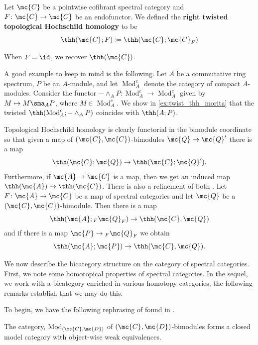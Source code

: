 \documentclass[11pt]{amsart}
\begin{document}
\begin{defn}\label{right_twisted}
  Let $\mc{C}$ be a pointwise cofibrant spectral category and $F\colon  \mc{C} \to \mc{C}$ be an endofunctor. We defined the \textbf{right twisted topological Hochschild homology} to be
  \[
  \thh(\mc{C}; F)\coloneqq\thh(\mc{C}; \mc{C}_F) 
  \]
\end{defn}

\begin{rmk}
When $F = \id$, we recover $\thh(\mc{C})$. 
\end{rmk}

\begin{example}\label{eg:twisted_thh}
A good example to keep in mind is the following. Let $A$ be a commutative ring spectrum,  $P$ be an $A$-module, and let $\operatorname{Mod}^c_A$ denote the category of compact $A$-modules. Consider the functor $-\wedge_AP \colon  \operatorname{Mod}^c_A \to \operatorname{Mod}^c_A$ given by $M \mapsto M \sma_A P$, where $M \in \operatorname{Mod}^c_A$. We show  in \cref{ex:twist_thh_morita} that the twisted $\thh(\operatorname{Mod}^c_A; -\wedge _AP)$ coincides with $\thh(A; P)$.
\end{example}


Topological Hochschild homology is clearly functorial in the bimodule coordinate so that given a map of $(\mc{C}, \mc{C})$-bimodules $\mc{Q} \to \mc{Q}'$  there is a map
\[
\thh(\mc{C}; \mc{Q}) \to \thh(\mc{C}; \mc{Q}').  
\]
Furthermore, if $\mc{A} \to \mc{C}$ is a map, then we get an induced map $\thh(\mc{A}) \to \thh(\mc{C})$. There is also a refinement of both \cite{blumberg_mandell}. Let $F\colon  \mc{A} \to \mc{C}$ be a map of spectral categories and let $\mc{Q}$ be a $(\mc{C},\mc{C})$-bimodule. Then there is a map
\[
\thh(\mc{A};{_F\mc{Q}_F}) \to \thh(\mc{C}, \mc{Q}) 
\]
and if there is a map $\mc{P} \to {_F \mc{Q}_F}$ we obtain
\[
\thh(\mc{A}; \mc{P}) \to \thh (\mc{C}, \mc{Q}). 
\]



We now describe the bicategory structure on the category of spectral categories. First, we note some homotopical properties of spectral categories. In the sequel, we work with a bicategory enriched in various homotopy categories; the following remarks establish that we may do this.

To begin, we have the following rephrasing of \cite[Prop.~6.1]{schwede_shipley} found in \cite[Prop.~2.4]{blumberg_mandell}.

\begin{prop}
The category, $\operatorname{Mod}_{(\mc{C}, \mc{D})}$ of $(\mc{C}, \mc{D})$-bimodules forms a closed model category with object-wise weak equivalences.
\end{prop}
\end{document}

